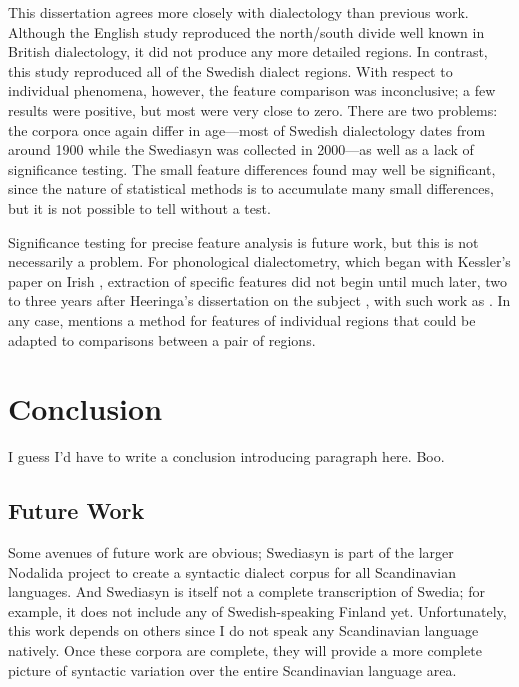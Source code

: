 This dissertation agrees more closely with dialectology than previous
work. Although the English study reproduced the north/south divide
well known in British dialectology, it did not produce any more
detailed regions. In contrast, this study reproduced all of the
Swedish dialect regions. With respect to individual phenomena,
however, the feature comparison was inconclusive; a few results were
positive, but most were very close to zero. There are two problems: the
corpora once again differ in age---most of Swedish dialectology dates
from around 1900 while the Swediasyn was collected in 2000---as well as a
lack of significance testing. The small feature differences found
may well be significant, since the nature of statistical
methods is to accumulate many small differences, but it is not
possible to tell without a test.

Significance testing for precise feature analysis is future work, but
this is not necessarily a problem. For phonological dialectometry,
which began with Kessler's paper on Irish \cite{kessler95}, extraction
of specific features did not begin until much later, two to three
years after Heeringa's dissertation on the subject \cite{heeringa04},
with such work as .
In any case,  mentions a method for features of
individual regions that could be adapted to comparisons between a pair
of regions.

\chapter{Conclusion}
\label{conclusion-chapter}

I guess I'd have to write a conclusion introducing paragraph
here. Boo.

\section{Future Work}

Some avenues of future work are obvious; Swediasyn is part of the
larger Nodalida project to create a syntactic dialect corpus for all
Scandinavian languages. And Swediasyn is itself not a complete
transcription of Swedia; for example, it does not include any of
Swedish-speaking Finland yet. Unfortunately, this work depends on
others since I do not speak any Scandinavian language natively. Once
these corpora are complete, they will provide a more complete picture
of syntactic variation over the entire Scandinavian language area.

